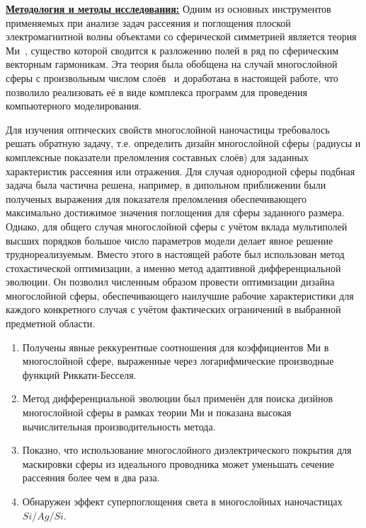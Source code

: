 \underline{\textbf{Методология и методы исследования:}} Одним из
основных инструментов применяемых при анализе задач рассеяния и
поглощения плоской электромагнитной волны объектами со сферической
симметрией является теория Ми~\cite{Mie-1908}, существо которой
сводится к разложению полей в ряд по сферическим векторным
гармоникам. Эта теория была обобщена на случай многослойной сферы с
произвольным числом слоёв~\cite{Yang-2003, Pena-scattnlay-2009} и
доработана в настоящей работе, что позволило реализовать её в виде
комплекса программ для проведения компьютерного моделирования.

Для изучения оптических свойств многослойной наночастицы требовалось
решать обратную задачу, т.е.  определить дизайн многослойной сферы
(радиусы и комплексные показатели преломления составных слоёв) для
заданных характеристик рассеяния или отражения. Для случая однородной
сферы подбная задача была частична решена, например, в дипольном
приближении были полученых выражения для показателя преломления
обеспечивающего максимально достижимое значения поглощения для сферы
заданного размера\cite{Tribelsky-2011,Grigoriev-2015}. Однако, для
общего случая многослойной сферы с учётом вклада мультиполей высших
порядков большое число параметров модели делает явное решение
труднореализуемым. Вместо этого в настоящей работе был использован
метод стохастической оптимизации, а именно метод адаптивной
дифференциальной эволюции. Он позволил численным образом провести
оптимизации дизайна многослойной сферы, обеспечивающего наилучшие
рабочие характеристики для каждого конкретного случая с учётом
фактических ограничений в выбранной предметной области.

\novelty   
\begin{enumerate}
  \item Получены явные реккурентные соотношения для
    коэффициентов Ми в многослойной сфере, выраженные через
    логарифмические производные функций Риккати-Бесселя. 
  \item Метод дифференциальной эволюции был применён для
    поиска дизйнов многослойной сферы в рамках теории Ми и
    показана высокая вычислительная производительность метода.
  \item Показно, что использование многослойного
    диэлектрического покрытия для маскировки сферы из идеального
    проводника может уменьшать сечение рассеяния более чем в два раза.
  \item Обнаружен эффект суперпоглощения света в многослойных
    наночастицах $Si/Ag/Si$.
\end{enumerate}




